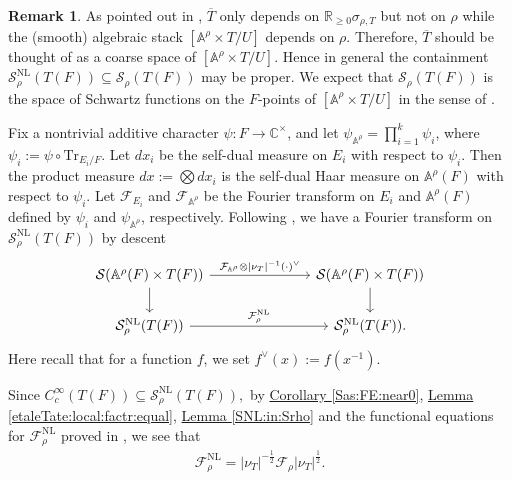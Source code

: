 \documentclass[10pt]{amsart}
\theoremstyle{definition}
\newtheorem{remark}[theorem]{Remark}
\numberwithin{equation}{section}
\numberwithin{equation}{subsection}
\newcommand{\RR}{\mathbb{R}}
\begin{document}
\begin{remark}\label{rem:toric}
    As pointed out in \cite[\S 5.2]{Ngo:Hankel}, $\overline{T}$ only depends on $\RR_{\ge 0}\sigma_{\rho,T}$ but not on $\rho$ while the (smooth) algebraic stack $[\mathbb{A}^\rho \times T/U]$ depends on $\rho$. Therefore, $\overline{T}$ should be thought of as a coarse space of $[\mathbb{A}^\rho \times T/U]$. Hence in general the containment $\mathcal{S}^{\mathrm{NL}}_\rho(T(F))\subseteq\mathcal{S}_\rho(T(F))$ may be proper. We expect that $\mathcal{S}_\rho(T(F))$ is the space of Schwartz functions on the $F$-points of $[\mathbb{A}^\rho \times T/U]$ in the sense of \cite{Sakellaridis:smoothstack}.
\end{remark}

Fix a nontrivial additive character $\psi:F\to \mathbb{C}^\times$, and let $\psi_{\mathbb{A}^\rho} = \prod\limits_{i=1}^k\psi_{i}$, where $\psi_i:=\psi\circ\mathrm{Tr}_{E_i/F}$. Let $dx_i$ be the self-dual measure on $E_i$ with respect to $\psi_i$. Then the product measure $dx:=\bigotimes dx_i$ is the self-dual Haar measure on $\mathbb{A}^{\rho}(F)$ with respect to $\psi_i$. Let $\mathcal{F}_{E_i}$ and $\mathcal{F}_{\mathbb{A}^\rho}$ be the Fourier transform on $E_i$ and $\mathbb{A}^\rho(F)$ defined by $\psi_i$ and $\psi_{\mathbb{A}^\rho}$, respectively. Following \cite{Luo:Ngo}, we have a Fourier transform on $\mathcal{S}_\rho^{\mathrm{NL}}(T(F))$ by descent
\begin{equation*}
    \begin{tikzcd}
        \mathcal{S}(\mathbb{A}^\rho(F)\times T(F))\arrow[rrr,"\mathcal{F}_{\mathbb{A}^\rho}\otimes  |\nu_T|^{-1}(\cdot)^\lor"]\arrow[d]& & & \mathcal{S}(\mathbb{A}^\rho(F)\times T(F))\arrow[d]\\
       \mathcal{S}_\rho^{\mathrm{NL}}(T(F))\arrow[rrr,"\mathcal{F}_\rho^{\mathrm{NL}}"]& & &\mathcal{S}_\rho^{\mathrm{NL}}(T(F)).
    \end{tikzcd}
\end{equation*}
Here recall that for a function $f$, we set $f^\vee(x):= f(x^{-1})$.


Since $C^\infty_c(T(F))\subseteq\mathcal{S}^{\mathrm{NL}}_\rho(T(F)),$ by \hyperref[Sas:FE:near0]{Corollary \ref{Sas:FE:near0}}, \hyperref[etaleTate:local:factr:equal]{Lemma \ref{etaleTate:local:factr:equal}}, \hyperref[SNL:in:Srho]{Lemma \ref{SNL:in:Srho}}  and the functional equations for $\mathcal{F}_\rho^{\mathrm{NL}}$ proved in \cite{Luo:Ngo}, we see that
\begin{align*}
    \mathcal{F}_\rho^{\mathrm{NL}} = |\nu_T|^{-\frac{1}{2}}\mathcal{F}_{\rho}|\nu_T|^{\frac{1}{2}}.
\end{align*}
\end{document}
